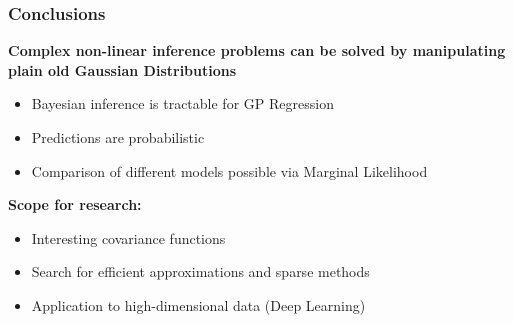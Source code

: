 \documentclass[10pt]{beamer}
\begin{document}
  \begin{frame}
    \frametitle{Conclusions}

    \textbf{Complex non-linear inference problems can be solved by manipulating plain old Gaussian Distributions}

    \begin{itemize}
      \item Bayesian inference is tractable for GP Regression
      \item Predictions are probabilistic
      \item Comparison of different models possible via Marginal Likelihood
    \end{itemize}

    \pause

    \textbf{Scope for research:}

    \begin{itemize}
      \item Interesting covariance functions
      \item Search for efficient approximations and sparse methods
      \item Application to high-dimensional data (Deep Learning)
    \end{itemize}

  \end{frame}
\end{document}
